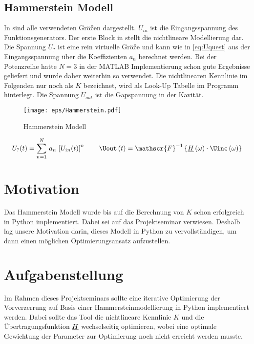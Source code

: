 \documentclass[../Report.tex]{subfiles}
\begin{document}
\subsection{Hammerstein Modell}
\label{subsec:einf.modell_BB.hammerstein}
In  sind alle verwendeten Größen dargestellt. $U_{in}$ ist die Eingangsspannung des Funktionsgenerators. Der erste Block in  stellt die nichtlineare Modellierung dar. Die Spannung $U_{?}$ ist eine rein virtuelle Größe und kann wie in \eqref{eq:Uquest} aus der Eingangsspannung über die Koeffizienten $a_n$ berechnet werden. Bei der Potenzreihe hatte $N = 3$ in der MATLAB Implementierung schon gute Ergebnisse geliefert und wurde daher weiterhin so verwendet. Die nichtlinearen Kennlinie im Folgenden nur noch als $K$ bezeichnet, wird als Look-Up Tabelle im Programm hinterlegt. Die Spannung $U_{out}$ ist die Gapspannung in der Kavität.
\begin{figure}[H]
	\centering
	\texttt{[image: eps/Hammerstein.pdf]}
	\caption{Hammerstein Modell}
  	\label{fig:Hammerstein}
\end{figure}
\begin{align}
	U_?(t)=\sum_{n=1}^N \, a_n \, \left[ U_{in}(t) \right]^n
	\label{eq:Uquest}
	\qquad
	\Uout \oft = \mathscr{F}^{-1} \left\{ \Hcompl \ofomega \cdot \Uinc \ofomega \right\}
\end{align}

\section{Motivation}
\label{sec:einf.motivation}
Das Hammerstein Modell wurde bis auf die Berechnung von $K$ schon erfolgreich in Python implementiert. Dabei sei auf das Projektseminar \cite{PJS_Denys} verwiesen. Deshalb lag unsere Motivation darin, dieses Modell in Python zu vervollständigen, um dann einen möglichen Optimierungsansatz aufzustellen.


\section{Aufgabenstellung}
\label{sec:einf.aufgabe}
Im Rahmen dieses Projektseminars sollte eine iterative Optimierung der Vorverzerrung auf Basis einer Hammersteinmodellierung in Python implementiert werden. Dabei sollte das Tool die nichtlineare Kennlinie $K$ und die Übertragungsfunktion $\underline{H}$ wechselseitig optimieren, wobei eine optimale Gewichtung der Parameter zur Optimierung noch nicht erreicht werden musste.
\end{document}
